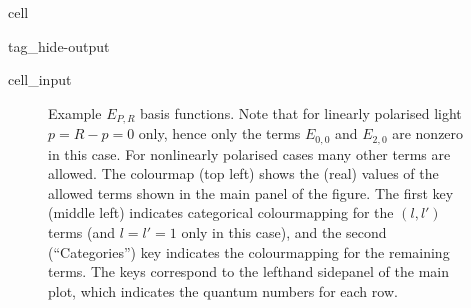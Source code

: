 \documentclass[letterpaper,table,10pt,english]{jupyterBook}
\begin{document}
\begin{sphinxuseclass}{cell}
\begin{sphinxuseclass}{tag_hide-output}
\begin{sphinxVerbatimInput}
\begin{sphinxuseclass}{cell_input}
\begin{sphinxVerbatim}[commandchars=\\\{\}]

 
\end{sphinxVerbatim}

\end{sphinxuseclass}\end{sphinxVerbatimInput}

\end{sphinxuseclass}
\end{sphinxuseclass}
\begin{figure}[htbp]
\centering
\capstart

\noindent{}
\caption{Example \(E_{P,R}\) basis functions. Note that for linearly polarised light \(p=R-p=0\) only, hence only the terms \(E_{0,0}\) and \(E_{2,0}\) are non\sphinxhyphen{}zero in this case. For non\sphinxhyphen{}linearly polarised cases many other terms are allowed. The colour\sphinxhyphen{}map (top left) shows the (real) values of the allowed terms shown in the main panel of the figure. The first key (middle left) indicates categorical colour\sphinxhyphen{}mapping for the \((l,l')\) terms (and \(l=l'=1\) only in this case), and the second (“Categories”) key indicates the colour\sphinxhyphen{}mapping for the remaining terms. The keys correspond to the left\sphinxhyphen{}hand side\sphinxhyphen{}panel of the main plot, which indicates the quantum numbers for each row.}\label{\detokenize{part1/theory_tensor_formalism_160723:fig-epr-basis}}\end{figure}
\end{document}
